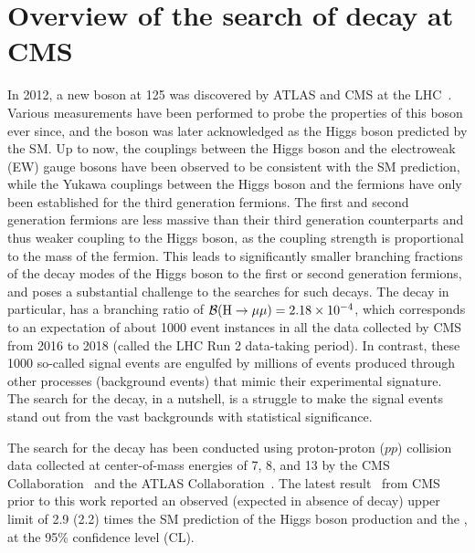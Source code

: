 \chapter{Overview of the search of \texorpdfstring{\hmm}{H to muons} decay at CMS}\label{chp:hmm_overview}

In 2012, a new boson at 125 \GeV was discovered by ATLAS and CMS at the LHC~\cite{Aad:2012tfa, Chatrchyan:2012xdj, Chatrchyan:2013lba}. 
Various measurements have been performed to probe the properties of this boson ever since, 
and the boson was later acknowledged as the Higgs boson predicted by the SM.
Up to now, the couplings between the Higgs boson and the electroweak (EW) gauge bosons have been observed to be consistent with the SM prediction, 
while the Yukawa couplings between the Higgs boson and the fermions have only been established for the third generation fermions. 
The first and second generation fermions are less massive than their third generation counterparts and thus weaker coupling to the Higgs boson, 
as the coupling strength is proportional to the mass of the fermion.
This leads to significantly smaller branching fractions of the decay modes of the Higgs boson to the first or second generation fermions, 
and poses a substantial challenge to the searches for such decays.  
The \hmm decay in particular, has a branching ratio of ${{\mathcal{B}(\mathrm{H} \to \mu\mu)} = 2.18 \times 10^{-4}}$, 
which corresponds to an expectation of about 1000 event instances in all the data collected by CMS from 2016 to 2018 (called the LHC Run 2 data-taking period).
In contrast, these 1000 so-called signal events are engulfed by millions of events produced through other processes (background events) that mimic their experimental signature.
The search for the \hmm decay, in a nutshell, is a struggle to make the signal events stand out from the vast backgrounds with statistical significance.

The search for the \hmm decay has been conducted using proton-proton ($pp$) collision data collected at center-of-mass energies of 7, 8, and 13 \TeV
by the CMS Collaboration~\cite{2015184, PhysRevLett.122.021801} and the ATLAS Collaboration~\cite{201468, PhysRevLett.119.051802, Aad:2020xfq}.
The latest result~\cite{PhysRevLett.122.021801} from CMS prior to this work reported an observed (expected in absence of \hmm decay) upper limit of 2.9 (2.2) times the 
SM prediction of the Higgs boson production and the \brhmm, at the 95\% confidence level (CL).

